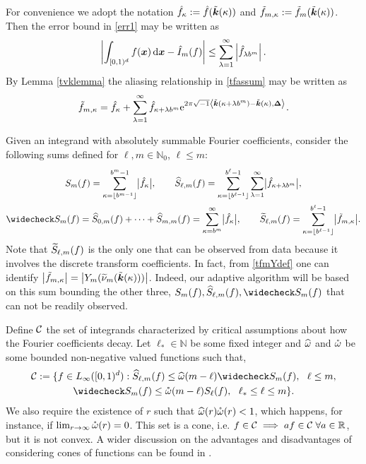 \documentclass[graybox]{svmult}
\newcommand{\R}{\mathbb{R}} %
\newcommand{\N}{\mathbb{N}} %
\newcommand{\bsx}{\boldsymbol{x}}    %
\newcommand{\bsDelta}{\boldsymbol{\Delta}}    %
\begin{document}
For convenience we adopt the notation $\hat{f}_{\kappa} :=\hat{f}(\tilde{\boldsymbol{k}}(\kappa))$ and $\tilde{f}_{m,\kappa} := \tilde{f}_m(\tilde{\boldsymbol{k}}(\kappa))$. Then the error bound in \eqref{err1} may be written as
\begin{equation}
\biggabs{ \int_{\cube} f(\bsx) \, \D \bsx - \hI_m(f)} 
\le \sum_{\lambda=1}^{\infty} \left \lvert \hf_{\lambda b^m}\right \rvert. \label{err2}
\end{equation}
By Lemma  \ref{tvklemma} the aliasing relationship in \eqref{tfassum} may be written as
\begin{align}
\tf_{m,\kappa} =\hf_{\kappa} + \sum_{\lambda=1}^{\infty} \hf_{\kappa+\lambda b^{m}} \E^{2 \pi \sqrt{-1} \ip{\tvk(\kappa+\lambda b^{m}) - \tvk(\kappa)}{\bsDelta}}. \label{tfassumc}
\end{align}

Given an integrand with absolutely summable Fourier coefficients, consider the following sums defined for $\ell,m \in \N_0$, $\ell \le m$:
\begin{gather*}
S_m(f) =  \sum_{\kappa=\left \lfloor b^{m-1} \right \rfloor}^{b^{m}-1} \bigabs{\hf_{\kappa}}, \qquad 
\hS_{\ell,m}(f)  = \sum_{\kappa=\left \lfloor b^{\ell-1} \right \rfloor}^{b^{\ell}-1} \sum_{\lambda=1}^{\infty} \bigabs{ \hf_{\kappa+\lambda b^{m}}}, \\
\wcS_m(f)=\hS_{0,m}(f) + \cdots + \hS_{m,m}(f)=
\sum_{\kappa=b^{m}}^{\infty} \bigabs{\hf_{\kappa}}, \qquad
\tS_{\ell,m}(f) = \sum_{\kappa=\left \lfloor b^{\ell-1}\right \rfloor}^{b^{\ell}-1} \bigabs{\tf_{m,\kappa}}.
\end{gather*}
Note that $\widetilde{S}_{\ell,m}(f)$ is the only one that can be observed from data because it involves the discrete transform coefficients. In fact, from \eqref{tfmYdef} one can identify $\bigl \lvert \tilde{f}_{m,\kappa} \bigr \rvert = \bigl \lvert Y_m(\widetilde{\nu}_m(\tilde{\boldsymbol{k}}(\kappa))) \bigr \rvert$.  Indeed, our adaptive algorithm will be based on this sum bounding the other three, $S_m(f),\hS_{\ell,m}(f),\wcS_m(f)$ that can not be readily observed. 

Define $\mathcal{C}$ the set of integrands characterized by critical assumptions about how the Fourier coefficients decay.  Let $\ell_* \in \N$ be some fixed integer and $\widehat{\omega}$ and $\mathring{\omega}$ be some bounded non-negative valued functions such that,
\begin{multline} \label{conecond}
\cc:=\{f \in \Lebesgue_\infty(\cube) : \hS_{\ell,m}(f) \le \homega(m-\ell) \wcS_m(f),\ \ \ell \le m, \\
\wcS_m(f) \le \wcomega(m-\ell) S_{\ell}(f),\ \  \ell_* \le \ell \le m\}.
\end{multline}
We also require the existence of $r$ such that $\widehat{\omega}(r) \mathring{\omega}(r)<1$, which happens, for instance, if $\lim_{r\rightarrow\infty}\mathring{\omega}(r)=0$. This set is a cone, i.e. $f \in \cc \implies af \in \cc\;\forall a\in\R$, but it is not convex. A wider discussion on the advantages and disadvantages of considering cones of functions can be found in \cite{Clancy201421}.
\end{document}
